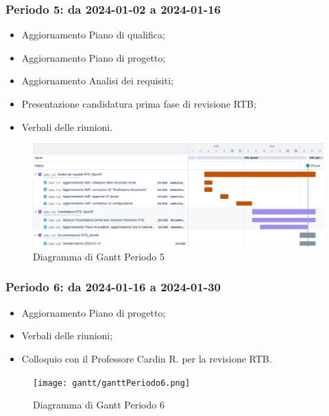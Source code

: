 \documentclass[10pt, a4paper]{article}
\begin{document}
\subsubsection{Periodo 5: da 2024-01-02 a 2024-01-16}
\begin{itemize}
    \item Aggiornamento Piano di qualifica;
    \item Aggiornamento Piano di progetto;
    \item Aggiornamento Analisi dei requisiti;
    \item Presentazione candidatura prima fase di revisione RTB;
    \item Verbali delle riunioni.
\end{itemize}
\begin{figure}[H]
    \centering        
    \includegraphics[width=15.5cm]{gantt/ganttPeriodo5.png}
    \caption{Diagramma di Gantt Periodo 5}
\end{figure}

\subsubsection{Periodo 6: da 2024-01-16 a 2024-01-30}
%
\begin{itemize}
    \item Aggiornamento Piano di progetto;
    \item Verbali delle riunioni;
    \item Colloquio con il Professore Cardin R. per la revisione RTB.
\end{itemize}
\begin{figure}[H]
    \centering        
    \texttt{[image: gantt/ganttPeriodo6.png]}
    \caption{Diagramma di Gantt Periodo 6}
\end{figure}
\end{document}
